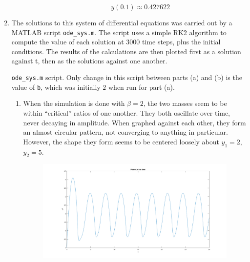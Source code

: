 \documentclass[11pt]{article}
\begin{document}
\begin{enumerate}
\begin{enumerate}
\begin{enumerate}
\begin{tabular}{lll}
			\end{tabular}

			\[y(0.1) \approx 0.427622\]

			\medskip

		\end{enumerate}

	\end{enumerate}

	\item The solutions to this system of differential equations was carried out by a MATLAB script \texttt{ode\_sys.m}. The script uses a simple RK2 algorithm to compute the value of each solution at 3000 time steps, plus the initial conditions. The results of the calculations are then plotted first as a solution against t, then as the solutions against one another.

	\begin{center}
	\texttt{ode\_sys.m} script. Only change in this script between parts (a) and (b) is the value of \texttt{b}, which was initially $2$ when run for part (a).
	
	\end{center}

	\medskip

	\begin{enumerate}

		\item When the simulation is done with $\beta = 2$, the two masses seem to be within ``critical'' ratios of one another. They both oscillate over time, never decaying in amplitude. When graphed against each other, they form an almost circular pattern, not converging to anything in particular. However, the shape they form seems to be centered loosely about $y_1 = 2$, $y_2 = 5$.

		\begin{figure}[H]
		\centering
		\includegraphics[width=\textwidth]{8a1.png}
		\end{figure}


\end{enumerate}
\end{enumerate}
\end{document}
